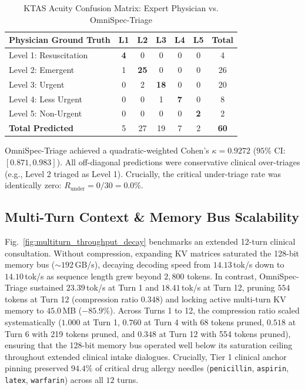 \documentclass[10pt,journal,compsoc]{IEEEtran}
\begin{document}
\begin{table}[!t]
\centering
\caption{KTAS Acuity Confusion Matrix: Expert Physician vs. OmniSpec-Triage}
\label{tab:confusion_matrix}
\footnotesize
\setlength{\tabcolsep}{4pt}
\begin{tabularx}{\columnwidth}{@{}lcccccc@{}}
\toprule
\textbf{Physician Ground Truth} & \textbf{L1} & \textbf{L2} & \textbf{L3} & \textbf{L4} & \textbf{L5} & \textbf{Total} \\
\midrule
Level 1: Resuscitation & \textbf{4} & 0 & 0 & 0 & 0 & 4 \\
Level 2: Emergent & 1 & \textbf{25} & 0 & 0 & 0 & 26 \\
Level 3: Urgent & 0 & 2 & \textbf{18} & 0 & 0 & 20 \\
Level 4: Less Urgent & 0 & 0 & 1 & \textbf{7} & 0 & 8 \\
Level 5: Non-Urgent & 0 & 0 & 0 & 0 & \textbf{2} & 2 \\
\midrule
\textbf{Total Predicted}& 5 & 27 & 19 & 7 & 2 & \textbf{60} \\
\bottomrule
\end{tabularx}
\end{table}

OmniSpec-Triage achieved a quadratic-weighted Cohen's $\kappa = 0.9272$ ($95\%$ CI: $[0.871, 0.983]$). All off-diagonal predictions were conservative clinical over-triages (e.g., Level 2 triaged as Level 1). Crucially, the critical under-triage rate was identically zero: $R_{\text{under}} = 0/30 = 0.0\%$.

\subsection{Multi-Turn Context \& Memory Bus Scalability}
Fig.~\ref{fig:multiturn_throughput_decay} benchmarks an extended 12-turn clinical consultation. Without compression, expanding KV matrices saturated the 128-bit memory bus ($\sim 192$\,GB/s), decaying decoding speed from $14.13$\,tok/s down to $14.10$\,tok/s as sequence length grew beyond $2{,}800$ tokens. In contrast, OmniSpec-Triage
sustained $23.39$\,tok/s at Turn 1 and $18.41$\,tok/s at Turn 12, pruning $554$ tokens at Turn 12 (compression ratio $0.348$) and locking active multi-turn KV memory to $45.0$\,MB ($-85.9\%$). Across Turns 1 to 12, the compression ratio scaled systematically ($1.000$ at Turn 1, $0.760$ at Turn 4 with 68 tokens pruned, $0.518$ at Turn 6
with 219 tokens pruned, and $0.348$ at Turn 12 with 554 tokens pruned), ensuring that the 128-bit memory bus operated well below its saturation ceiling throughout extended clinical intake dialogues. Crucially, Tier 1 clinical anchor pinning preserved $94.4\%$ of critical drug allergy needles (\texttt{penicillin}, \texttt{aspirin},
\texttt{latex}, \texttt{warfarin}) across all $12$ turns.
\end{document}
